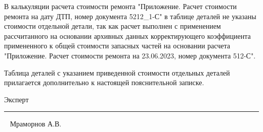 В калькуляции расчета стоимости ремонта "Приложение. Расчет стоимости ремонта на дату ДТП, номер документа 5212\_1-С" в таблице деталей не указаны стоимости отдельной детали, так как расчет выполнен с применением рассчитанного на основании архивных данных корректирующего коэффициента примененного к общей стоимости запасных частей  на основании расчета "Приложение. Расчет стоимости ремонта на 23.06.2023, номер документа 512-С".

Таблица деталей с указанием приведенной стоимости отдельных деталей прилагается дополнительно к настоящей пояснительной записке.





\vspace{35mm}

{Эксперт}\hfill      \rule{4cm}{0.1 mm} \,\,\,      {Мраморнов А.В.}
